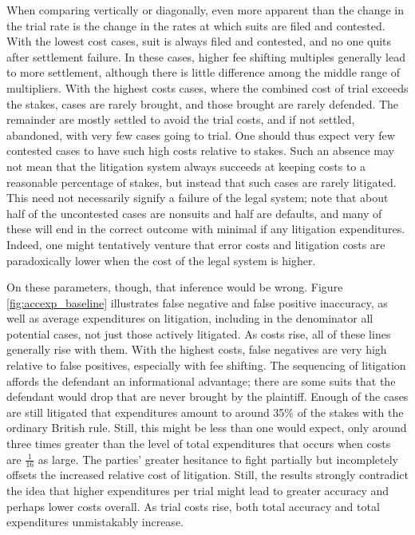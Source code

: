 \documentclass{article}
\begin{document}
When comparing vertically or diagonally, even more apparent than the change in the trial rate is the change in the rates at which suits are filed and contested.  With the lowest cost cases, suit is always filed and contested, and no one quits after settlement failure. In these cases, higher fee shifting multiples generally lead to more settlement, although there is little difference among the middle range of multipliers. With the highest costs cases, where the combined cost of trial exceeds the stakes, cases are rarely brought, and those brought are rarely defended. The remainder are mostly settled to avoid the trial costs, and if not settled, abandoned, with very few cases going to trial. One should thus expect very few contested cases to have such high costs relative to stakes. Such an absence may not mean that the litigation system always succeeds at keeping costs to a reasonable percentage of stakes, but instead that such cases are rarely litigated. This need not necessarily signify a failure of the legal system; note that about half of the uncontested cases are nonsuits and half are defaults, and many of these will end in the correct outcome with minimal if any litigation expenditures. Indeed, one might tentatively venture that error costs and litigation costs are paradoxically lower when the cost of the legal system is higher. 

On these parameters, though, that inference would be wrong. Figure \ref{fig:accexp_baseline} illustrates false negative and false positive inaccuracy, as well as average expenditures on litigation, including in the denominator all potential cases, not just those actively litigated. As costs rise, all of these lines generally rise with them. With the highest costs, false negatives are very high relative to false positives, especially with fee shifting. The sequencing of litigation affords the defendant an informational advantage; there are some suits that the defendant would drop that are never brought by the plaintiff. Enough of the cases are still litigated that expenditures amount to around 35\% of the stakes with the ordinary British rule. Still, this might be less than one would expect, only around three times greater than the level of total expenditures that occurs when costs are $\frac{1}{16}$ as large. The parties' greater hesitance to fight partially but incompletely offsets the increased relative cost of litigation. Still, the results strongly contradict the idea that higher expenditures per trial might lead to greater accuracy and perhaps lower costs overall. As trial costs rise, both total accuracy and total expenditures unmistakably increase.
\end{document}

